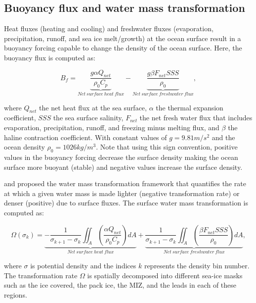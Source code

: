 \documentclass[lineno,sn-basic]{sn-jnl}%
\begin{document}
\subsection*{Buoyancy flux and water mass transformation}
 
Heat fluxes (heating and cooling) and freshwater fluxes (evaporation, precipitation, runoff, and sea ice melt/growth) at the ocean surface result in a buoyancy forcing capable to change the density of the ocean surface. Here, the buoyancy flux is computed as:

\begin{equation}
    B_f = \underbrace{\frac{g \alpha Q_{net}}{\rho_0 C_p}}_{Net\ surface\ heat\ flux} - \underbrace{\frac{g \beta F_{net} SSS }{\rho_0}}_{Net\ surface\ freshwater\ flux},
\end{equation}

where $Q_{net}$ the net heat flux at the sea surface, $\alpha$ the thermal expansion coefficient, $SSS$ the sea surface salinity, $F_{net}$ the net fresh water flux that includes evaporation, precipitation, runoff, and freezing minus melting flux, and $\beta$ the haline contraction coefficient. With constant values of $g = 9.81 m/s^2$ and the ocean density $\rho_0 = 1026 kg/m^3$. 
Note that using this sign convention, positive values in the buoyancy forcing decrease the surface density making the ocean surface more buoyant (stable) and negative values increase the surface density. 

\citet{Nurser_WMT_1999} and  \citet{Walin_WMT_1982} proposed the water mass transformation framework that quantifies the rate at which a given water mass is made lighter (negative transformation rate) or denser (positive) due to surface fluxes. The surface water mass transformation is computed as:

\begin{equation}
    \Omega(\sigma_k) = \underbrace{- \frac{1}{\sigma_{k+1}-\sigma_k}\iint_A\left(\frac{\alpha Q_{net}}{\rho_0 C_p}\right)dA}_{Net\ surface\ heat\ flux} + \underbrace{\frac{1}{\sigma_{k+1}-\sigma_k}\iint_A\left(\frac{\beta F_{net} SSS }{\rho_0}\right)dA}_{Net\ surface\ freshwater\ flux},
\end{equation}

where $\sigma$ is potential density and the indices $k$ represents the density bin number. The transformation rate $\Omega$ is spatially decomposed into different sea-ice masks such as the ice covered, the pack ice, the MIZ, and the leads in each of these regions. 
\end{document}

